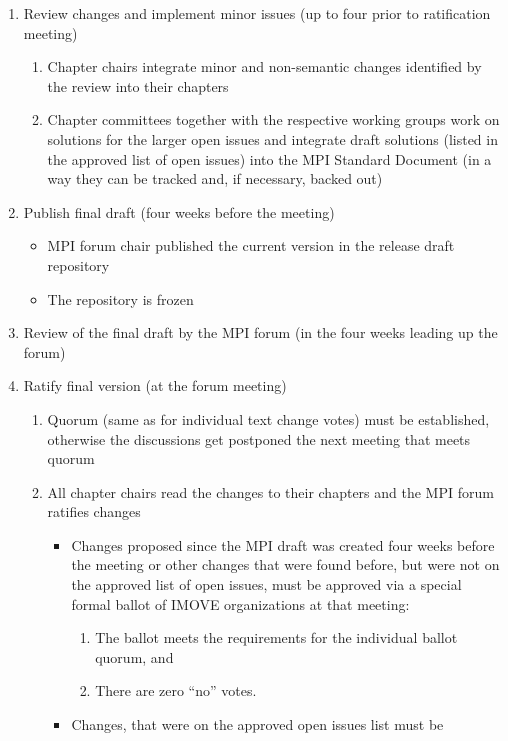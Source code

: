 {{\begin{enumerate}
\item Review changes and implement minor issues (up to four prior to
  ratification meeting)
  \begin{enumerate}
  \item Chapter chairs integrate minor and non-semantic changes
    identified by the review into their chapters
  \item Chapter committees together with the respective working groups
    work on solutions for the larger open issues and integrate draft
    solutions (listed in the approved list of open issues) into the
    MPI Standard Document (in a way they can be tracked and, if
    necessary, backed out)
  \end{enumerate}
\item Publish final draft (four weeks before the meeting)
  \begin{itemize}
  \item MPI forum chair published the current version in the release
    draft repository
  \item The repository is frozen
  \end{itemize}
\item Review of the final draft by the MPI forum (in the four weeks
  leading up the forum)
\item Ratify final version (at the forum meeting)
  \begin{enumerate}
  \item Quorum (same as for individual text change votes) must be
    established, otherwise the discussions get postponed the next
    meeting that meets quorum
  \item All chapter chairs read the changes to their chapters and the
    MPI forum ratifies changes
    \begin{itemize}
    \item Changes proposed since the MPI draft was created four weeks
      before the meeting or other changes that were found before, but
      were not on the approved list of open issues, must be approved
      via a special formal ballot of IMOVE organizations at that
      meeting:
      \begin{enumerate}
      \item The ballot meets the requirements for the individual
        ballot quorum, and
      \item There are zero ``no'' votes.
      \end{enumerate}
    \item Changes, that were on the approved open issues list must be

\end{itemize}
\end{enumerate}
\end{enumerate}}}
